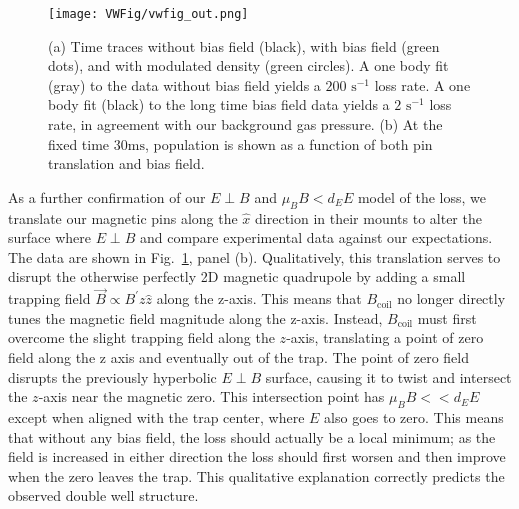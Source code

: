 \documentclass[%
 reprint,
groupedaddress,
 amsmath,amssymb,
 aps,
prl,
]{revtex4-1}
\newcommand{\epb}{$E\!\perp\!B$}
\begin{document}
\begin{figure}[tb]
\texttt{[image: VWFig/vwfig\_out.png]}%
\caption{
(a) Time traces without bias field (black), with bias field (green dots), and with modulated density (green circles). A one body fit (gray) to the data without bias field yields a $200\text{ s}^{-1}$ loss rate. A one body fit (black) to the long time bias field data yields a $2\text{ s}^{-1}$ loss rate, in agreement with our background gas pressure. (b) At the fixed time $30 \text{ms}$, population is shown as a function of both pin translation and bias field.
\label{fig:WVplot}}
\end{figure}


As a further confirmation of our \epb{}  and $\mu_BB<d_EE$ model of the loss, we translate our magnetic pins along the $\hat{x}$ direction in their mounts to alter the surface where \epb{}  and compare experimental data against our expectations. The data are shown in Fig.~\ref{fig:WVplot}, panel (b). Qualitatively, this translation serves to disrupt the otherwise perfectly 2D magnetic quadrupole by adding a small trapping field $\vec{B}\propto B^\prime z\hat{z}$ along the z-axis. This means that $B_\text{coil}$ no longer directly tunes the magnetic field magnitude along the z-axis. Instead, $B_\text{coil}$ must first overcome the slight trapping field along the $z$-axis, translating a point of zero field along the z axis and eventually out of the trap. The point of zero field disrupts the previously hyperbolic \epb{} surface, causing it to twist and intersect the $z$-axis near the magnetic zero. This intersection point has $\mu_BB<< d_EE$ except when aligned with the trap center, where $E$ also goes to zero. This means that without any bias field, the loss should actually be a local minimum; as the field is increased in either direction the loss should first worsen and then improve when the zero leaves the trap. This qualitative explanation correctly predicts the observed double well structure.
\end{document}

